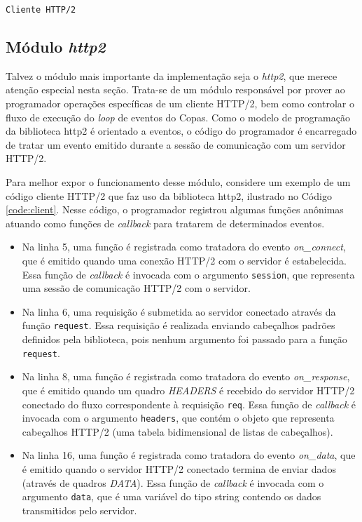 \begin{center}
 \begin{minipage}{0.7\textwidth}
  \begin{codigo}[H]
   \small
   \caption{\texttt{Cliente HTTP/2}}
   \label{code:client}
  \end{codigo}
 \end{minipage}
\end{center}

\subsection{Módulo {\em http2}}
\label{subsec:http2lua}

Talvez o módulo mais importante da implementação seja o {\em http2}, que merece atenção especial nesta seção. Trata-se de um módulo responsável por prover ao programador operações específicas de um cliente HTTP/2, bem como controlar o fluxo de execução do {\em loop} de eventos do Copas. Como o modelo de programação da biblioteca http2 é orientado a eventos, o código do programador é encarregado de tratar um evento emitido durante a sessão de comunicação com um servidor HTTP/2.

Para melhor expor o funcionamento desse módulo, considere um exemplo de um código cliente HTTP/2 que faz uso da biblioteca http2, ilustrado no Código \ref{code:client}. Nesse código, o programador registrou algumas funções anônimas atuando como funções de {\em callback} para tratarem de determinados eventos.

\begin{itemize}
    \item Na linha 5, uma função é registrada como tratadora do evento {\em on\_connect}, que é emitido quando uma conexão HTTP/2 com o servidor é estabelecida. Essa função de {\em callback} é invocada com o argumento \verb|session|, que representa uma sessão de comunicação HTTP/2 com o servidor.
    \item Na linha 6, uma requisição é submetida ao servidor conectado através da função \verb|request|. Essa requisição é realizada enviando cabeçalhos padrões definidos pela biblioteca, pois nenhum argumento foi passado para a função \verb|request|.
    \item Na linha 8, uma função é registrada como tratadora do evento {\em on\_response}, que é emitido quando um quadro {\em HEADERS} é recebido do servidor HTTP/2 conectado do fluxo correspondente à requisição \verb|req|. Essa função de {\em callback} é invocada com o argumento \verb|headers|, que contém o objeto que representa cabeçalhos HTTP/2 (uma tabela bidimensional de listas de cabeçalhos).
    \item Na linha 16, uma função é registrada como tratadora do evento {\em on\_data}, que é emitido quando o servidor HTTP/2 conectado termina de enviar dados (através de quadros {\em DATA}). Essa função de {\em callback} é invocada com o argumento \verb|data|, que é uma variável do tipo string contendo os dados transmitidos pelo servidor.
\end{itemize}

